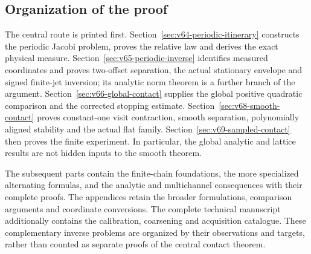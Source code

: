 \subsection{Organization of the proof}

The central route is printed first.  Section~\ref{sec:v64-periodic-itinerary}
constructs the periodic Jacobi problem, proves the relative law and derives
the exact physical measure.  Section~\ref{sec:v65-periodic-inverse}
identifies measured coordinates and proves two-offset separation, the
actual stationary envelope and signed finite-jet inversion; its analytic
norm theorem is a further branch of the argument.
Section~\ref{sec:v66-global-contact} supplies the global positive
quadratic comparison and the corrected stopping estimate.
Section~\ref{sec:v68-smooth-contact} proves constant-one visit contraction,
smooth separation, polynomially aligned stability and the actual flat
family.  Section~\ref{sec:v69-sampled-contact} then proves the finite
experiment.  In particular, the global analytic and lattice results are
not hidden inputs to the smooth theorem.

The subsequent parts contain the finite-chain foundations, the more
specialized alternating formulas, and the analytic and multichannel
consequences with their complete proofs.  The appendices retain the
broader formulations, comparison arguments and coordinate conversions.
The complete technical manuscript additionally contains the calibration,
coarsening and acquisition catalogue.  These complementary inverse
problems are organized by their observations and targets, rather than
counted as separate proofs of the central contact theorem.
